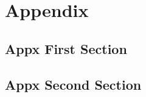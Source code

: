 
\chapter{Appendix}

\lipsum[42]

\section{Appx First Section}

\lipsum[43-54]

\section{Appx Second Section}

\lipsum[55]